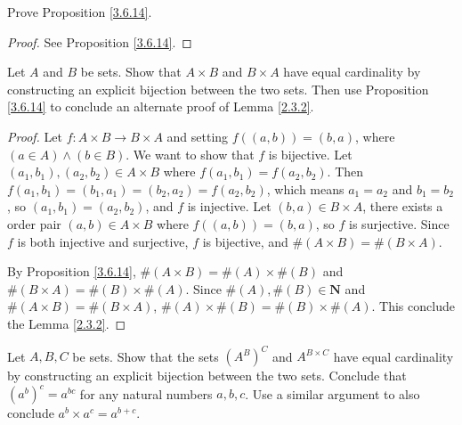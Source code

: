 \begin{exercise}\label{ex 3.6.4}
Prove Proposition \ref{3.6.14}.
\end{exercise}

\begin{proof}
See Proposition \ref{3.6.14}.
\end{proof}

\begin{exercise}\label{ex 3.6.5}
Let \(A\) and \(B\) be sets.
Show that \(A \times B\) and \(B \times A\) have equal cardinality by constructing an explicit bijection between the two sets.
Then use Proposition \ref{3.6.14} to conclude an alternate proof of Lemma \ref{2.3.2}.
\end{exercise}

\begin{proof}
Let \(f : A \times B \to B \times A\) and setting \(f((a, b)) = (b, a)\), where \((a \in A) \land (b \in B)\).
We want to show that \(f\) is bijective.
Let \((a_1, b_1), (a_2, b_2) \in A \times B\) where \(f(a_1, b_1) = f(a_2, b_2)\).
Then \(f(a_1, b_1) = (b_1, a_1) = (b_2, a_2) = f(a_2, b_2)\), which means \(a_1 = a_2\) and \(b_1 = b_2\), so \((a_1, b_1) = (a_2, b_2)\), and \(f\) is injective.
Let \((b, a) \in B \times A\), there exists a order pair \((a, b) \in A \times B\) where \(f((a, b)) = (b, a)\), so \(f\) is surjective.
Since \(f\) is both injective and surjective, \(f\) is bijective, and \(\#(A \times B) = \#(B \times A)\).

By Proposition \ref{3.6.14}, \(\#(A \times B) = \#(A) \times \#(B)\) and \(\#(B \times A) = \#(B) \times \#(A)\).
Since \(\#(A), \#(B) \in \mathbf{N}\) and \(\#(A \times B) = \#(B \times A)\), \(\#(A) \times \#(B) = \#(B) \times \#(A)\).
This conclude the Lemma \ref{2.3.2}.
\end{proof}

\begin{exercise}\label{ex 3.6.6}
Let \(A, B, C\) be sets.
Show that the sets \((A^B)^C\) and \(A^{B \times C}\) have equal cardinality by constructing an explicit bijection between the two sets.
Conclude that \((a^b)^c = a^{bc}\) for any natural numbers \(a, b, c\).
Use a similar argument to also conclude \(a^b \times a^c = a^{b+c}\).
\end{exercise}

